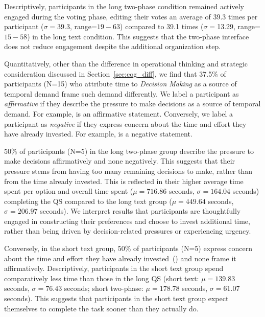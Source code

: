 Descriptively, participants in the long two-phase condition remained actively engaged during the voting phase, editing their votes an average of 39.3 times per participant ($\sigma=$39.3, range=$19-63$) compared to 39.1 times ($\sigma=$13.29, range=$15-58$) in the long text condition. This suggests that the two-phase interface does not reduce engagement despite the additional organization step.

Quantitatively, other than the difference in operational thinking and strategic consideration discussed in Section~\ref{sec:cog_diff}, we find that 37.5\% of participants (N=15) who attribute time to \textit{Decision Making} as a source of temporal demand frame such demand differently. We label a participant as \textit{affirmative} if they describe the pressure to make decisions as a source of temporal demand. For example,  is an affirmative statement. Conversely, we label a participant as \textit{negative} if they express concern about the time and effort they have already invested. For example,  is a negative statement.


50\% of participants (N=5) in the long two-phase group describe the pressure to make decisions affirmatively and none negatively. This suggests that their pressure stems from having too many remaining decisions to make, rather than from the time already invested. This is reflected in their higher average time spent per option and overall time spent ($\mu=716.86$ seconds, $\sigma=164.04$ seconds) completing the QS compared to the long text group ($\mu=449.64$ seconds, $\sigma=206.97$ seconds). We interpret results that participants are thoughtfully engaged in constructing their preferences and choose to invest additional time, rather than being driven by decision-related pressures or experiencing urgency.

Conversely, in the short text group, 50\% of participants (N=5) express concern about the time and effort they have already invested~() and none frame it affirmatively. Descriptively, participants in the short text group spend comparatively less time than those in the long QS (short text: $\mu=139.83$ seconds, $\sigma=76.43$ seconds; short two-phase: $\mu=178.78$ seconds, $\sigma=61.07$ seconds). This suggests that participants in the short text group expect themselves to complete the task sooner than they actually do. 

